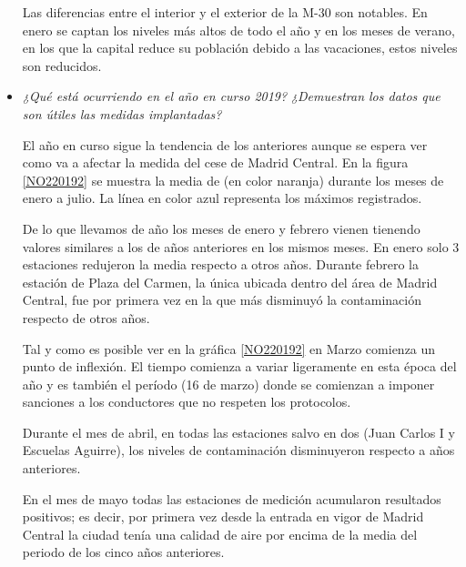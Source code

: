 \begin{itemize}
	Las diferencias entre el interior y el exterior de la M-30 son notables. En enero se captan los niveles más altos de todo el año y en los meses de verano, en los que la capital reduce su población debido a las vacaciones, estos niveles son reducidos. 
	
	
	\item \textit{¿Qué está ocurriendo en el año en curso 2019?} \textit{¿Demuestran los datos que son útiles las medidas implantadas?}
	
	El año en curso sigue la tendencia de los anteriores aunque se espera ver como va a afectar la medida del cese de Madrid Central. En la figura \ref{NO220192} se muestra la media de  (en color naranja) durante los meses de enero a julio. La línea en color azul representa los máximos registrados.
	
	De lo que llevamos de año los meses de enero y febrero vienen tienendo valores similares a los de años anteriores en los mismos meses. En enero solo 3 estaciones redujeron la media respecto a otros años. Durante febrero la estación de Plaza del Carmen, la única ubicada dentro del área de Madrid Central, fue por primera vez en la que más disminuyó la contaminación respecto de otros años.
	
	
	Tal y como es posible ver en la gráfica \ref{NO220192} en Marzo comienza un punto de inflexión. El tiempo comienza a variar ligeramente en esta época del año y es también el período (16 de marzo) donde se comienzan a imponer sanciones a los conductores que no respeten los protocolos. 
	
	Durante el mes de abril, en todas las estaciones salvo en dos (Juan Carlos I y Escuelas Aguirre), los niveles de contaminación disminuyeron respecto a años anteriores.
	
	En el mes de mayo todas las estaciones de medición acumularon resultados positivos; es decir, por primera vez desde la entrada en vigor de Madrid Central la ciudad tenía una calidad de aire por encima de la media del periodo de los cinco años anteriores.
\end{itemize}



	